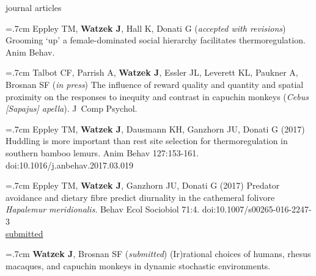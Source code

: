 \documentclass[]{friggeri-cv}
\begin{document}




{\subfont\large{} journal articles}

\hangindent=.7cm Eppley TM, \textbf{Watzek J}, Hall K, Donati G (\emph{accepted with revisions}) Grooming `up' a female-dominated social hierarchy facilitates thermoregulation. Anim Behav.

\hangindent=.7cm Talbot CF, Parrish A, \textbf{Watzek J}, Essler JL, Leverett KL, Paukner A, Brosnan SF (\emph{in press}) The influence of reward quality and quantity and spatial proximity on the responses to inequity and contrast in capuchin monkeys (\emph{Cebus [Sapajus] apella}). J~Comp Psychol.

\hangindent=.7cm Eppley TM, \textbf{Watzek J}, Dausmann KH, Ganzhorn JU, Donati G (2017) Huddling is more important than rest site selection for thermoregulation in southern bamboo lemurs. Anim Behav 127:153-161. doi:10.1016/j.anbehav.2017.03.019

\hangindent=.7cm Eppley TM, \textbf{Watzek J}, Ganzhorn JU, Donati G (2017) Predator avoidance and dietary fibre predict diurnality in the cathemeral folivore \emph{Hapalemur meridionalis}. Behav Ecol Sociobiol 71:4. doi:10.1007/s00265-016-2247-3 \\[.5cm]


\hspace{.35cm} { \underline{submitted}}

\hangindent=.7cm \textbf{Watzek J}, Brosnan SF (\emph{submitted}) (Ir)rational choices of humans, rhesus macaques, and capuchin monkeys in dynamic stochastic environments.
\end{document}

